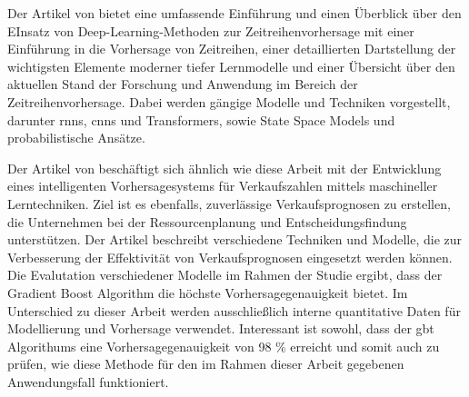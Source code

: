 \documentclass[lettersize,journal]{IEEEtran}
\begin{document}
Der Artikel von  bietet eine umfassende Einführung und einen Überblick über den EInsatz von Deep-Learning-Methoden zur Zeitreihenvorhersage mit einer Einführung in die Vorhersage von Zeitreihen, einer detaillierten Dartstellung der wichtigsten Elemente moderner tiefer Lernmodelle und einer Übersicht über den aktuellen Stand der Forschung und Anwendung im Bereich der Zeitreihenvorhersage. Dabei werden gängige Modelle und Techniken vorgestellt, darunter \glspl{rnn}, \glspl{cnn} und Transformers, sowie State Space Models und probabilistische Ansätze.

Der Artikel von  beschäftigt sich ähnlich wie diese Arbeit mit der Entwicklung eines intelligenten Vorhersagesystems für Verkaufszahlen mittels maschineller Lerntechniken. Ziel ist es ebenfalls, zuverlässige Verkaufsprognosen zu erstellen, die Unternehmen bei der Ressourcenplanung und Entscheidungsfindung unterstützen. Der Artikel beschreibt verschiedene Techniken und Modelle, die zur Verbesserung der Effektivität von Verkaufsprognosen eingesetzt werden können. Die Evalutation verschiedener Modelle im Rahmen der Studie ergibt, dass der Gradient Boost Algorithm die höchste Vorhersagegenauigkeit bietet. Im Unterschied zu dieser Arbeit werden ausschließlich interne quantitative Daten für Modellierung und Vorhersage verwendet. Interessant ist sowohl, dass der \gls{gbt} Algorithums eine Vorhersagegenauigkeit von 98 \% erreicht und somit auch zu prüfen, wie diese Methode für den im Rahmen dieser Arbeit gegebenen Anwendungsfall funktioniert.













\end{document}
